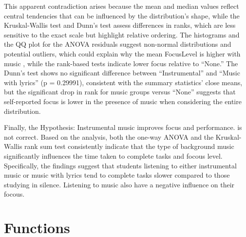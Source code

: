\documentclass[
]{article}
\begin{document}
This apparent contradiction arises because the mean and median values
reflect central tendencies that can be influenced by the distribution's
shape, while the Kruskal-Wallis test and Dunn's test assess differences
in ranks, which are less sensitive to the exact scale but highlight
relative ordering. The histograms and the QQ plot for the ANOVA
residuals suggest non-normal distributions and potential outliers, which
could explain why the mean FocusLevel is higher with music , while the
rank-based tests indicate lower focus relative to ``None.'' The Dunn's
test shows no significant difference between ``Instrumental'' and
``Music with lyrics'' (p = 0.29991), consistent with the summary
statistics' close means, but the significant drop in rank for music
groups versus ``None'' suggests that self-reported focus is lower in the
presence of music when considering the entire distribution.

Finally, the Hypothesis: Instrumental music improves focus and
performance. is not correct. Based on the analysis, both the one-way
ANOVA and the Kruskal-Wallis rank sum test consistently indicate that
the type of background music significantly influences the time taken to
complete tasks and focous level. Specifically, the findings suggest that
students listening to either instrumental music or music with lyrics
tend to complete tasks slower compared to those studying in silence.
Listening to music also have a negative influence on their focous.

\section{Functions}\label{functions}
\end{document}
